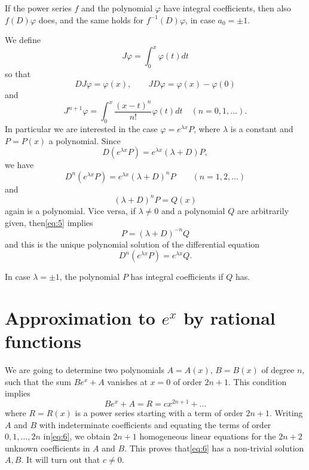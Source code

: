 If the power series $f$ and the polynomial $\varphi$ have integral coefficients, then also $f(D)\varphi$ does, and the same holds for $f^{-1}(D)\varphi$, in case $a_0 = \pm 1$.

We define
\[ J \varphi = \int_0^x \varphi(t) dt \]
so that
\[ D J \varphi = \varphi(x), \qquad J D \varphi = \varphi(x) - \varphi(0) \]
and
\begin{equation} J^{n+1} \varphi = \int_0^x \frac{(x-t)^n}{n!} \varphi(t) dt \quad (n = 0,1,\dots). \tag{3}\label{eq:3} \end{equation}
In particular we are interested in the case $\varphi = e^{\lambda x} P$, where $\lambda$ is a constant and $P = P(x)$ a polynomial. Since
\[ D(e^{\lambda x} P) = e^{\lambda x} (\lambda + D)P, \]
we have
\begin{equation} D^{n}(e^{\lambda x}P) = e^{\lambda x}(\lambda + D)^{n}P \qquad (n=1,2,\dots) \tag{4}\label{eq:4} \end{equation}
and
\begin{equation} (\lambda + D)^{n}P = Q(x) \tag{5}\label{eq:5} \end{equation}
again is a polynomial. Vice versa, if $\lambda \neq 0$ and a polynomial $Q$ are arbitrarily given, then\eqref{eq:5} implies
\[ P = (\lambda + D)^{-n}Q \]
and this is the unique polynomial solution of the differential equation
\[ D^{n}(e^{\lambda x}P) = e^{\lambda x}Q. \]

In case $\lambda = \pm 1$, the polynomial $P$ has integral coefficients if $Q$ has.

\section{Approximation to $e^x$ by rational functions}

We are going to determine two polynomials $A = A(x)$, $B = B(x)$ of degree $n$, such that the sum $B e^x + A$ vanishes at $x = 0$ of order $2n + 1$. This condition implies
\begin{equation} B e^x + A = R = c x^{2n+1} + \dots \tag{6}\label{eq:6} \end{equation}
where $R = R(x)$ is a power series starting with a term of order $2n + 1$. Writing $A$ and $B$ with indeterminate coefficients and equating the terms of order $0, 1, \dots, 2n$ in\eqref{eq:6}, we obtain $2n+1$ homogeneous linear equations for the $2n+2$ unknown coefficients in $A$ and $B$. This proves that\eqref{eq:6} has a non-trivial solution $A, B$. It will turn out that $c \neq 0$.

